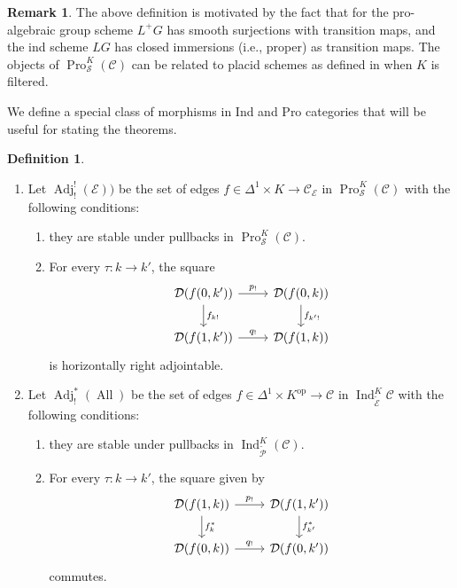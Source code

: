 \documentclass[14pt]{article}
\theoremstyle{definition}
\newtheorem{definition}[theorem]{Definition}
\newtheorem{remark}[theorem]{Remark}
\newcommand{\E}{\mathcal{E}}
\newcommand{\D}{\mathcal{D}}
\renewcommand{\P}{\mathcal{P}}
\newcommand{\op}[1]{\operatorname{#1}}
\renewcommand{\S}{\mathcal{S}}
\newcommand{\Ca}{\mathcal{C}}
\numberwithin{subsection}{section}
\begin{document}
\begin{remark}
  The above definition is motivated by the fact that for  the pro-algebraic group scheme $L^+G$ has smooth surjections with transition maps, and the ind scheme $LG$ has closed immersions (i.e., proper) as transition maps. The objects of  $\op{Pro}^K_{\S}(\Ca)$ can be related to placid schemes as defined in \cite{BOUTHIER2022108572} when $K$ is filtered.
\end{remark}
We define a special class of morphisms in Ind and Pro categories that will be useful for stating the theorems. 
\begin{definition}\label{defintiion:IndProAdjedgesdefinition}

\begin{enumerate}
    \item Let $\op{Adj}_!^!(\E))$ be the set of edges $f \in \Delta^1 \times K \to \Ca_{\E}$ in $\op{Pro}^K_{\S}(\Ca)$  with the following conditions: 
    \begin{enumerate}
    \item they are stable under pullbacks in $\op{Pro}^K_{\S}(\Ca)$.
    \item For every $\tau: k \to k'$, the square  
    \begin{equation}
    \begin{tikzcd}
        \D(f(0,k')) \arrow[r," p_!"] \arrow[d,"f_{k!}"] & \D(f(0,k)) \arrow[d,"f_{k'!}"]\\
        \D(f(1,k')) \arrow[r,"q_!"] & \D(f(1,k))
        \end{tikzcd}
    \end{equation}
    is horizontally right adjointable.
    \end{enumerate}
    \item Let $\op{Adj}_!^*(\op{All})$ be the set of edges $f \in \Delta^1 \times K^{\op{op}} \to \Ca$ in $\op{Ind}^K_{\tilde{\E}}\Ca$  with the following conditions:

    \begin{enumerate}
    \item they are stable under pullbacks in $\op{Ind}^K_{\tilde{\P}}(\Ca)$.
    \item For every $\tau: k \to k'$, the square  given by
    \begin{equation}
    \begin{tikzcd}
        \D(f(1,k)) \arrow[r," p_!"] \arrow[d,"f_{k}^*"] & \D(f(1,k')) \arrow[d,"f_{k'}^*"]\\
        \D(f(0,k)) \arrow[r,"q_!"] & \D(f(0,k'))
        \end{tikzcd}
    \end{equation}
    commutes. 
    \end{enumerate}
\end{enumerate}

\end{definition}
\end{document}
